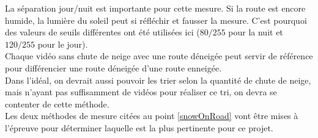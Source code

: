 La séparation jour/nuit est importante pour cette mesure. Si la route est encore humide,
la lumière du soleil peut si réfléchir et fausser la mesure. C'est pourquoi des valeurs de seuils différentes
ont été utilisées ici ($80/255$ pour la nuit et $120/255$ pour le jour).\\
Chaque vidéo sans chute de neige avec une route déneigée peut servir de 
référence pour différencier une route déneigée d'une route enneigée.\\
Dans l'idéal, on devrait aussi pouvoir les trier selon la quantité de chute
de neige, mais n'ayant pas suffisamment de vidéos pour réaliser ce tri, on devra
se contenter de cette méthode.\\
Les deux méthodes de mesure citées au point \ref{snowOnRoad} vont être mises
à l'épreuve pour déterminer laquelle est la plus pertinente pour ce projet.


